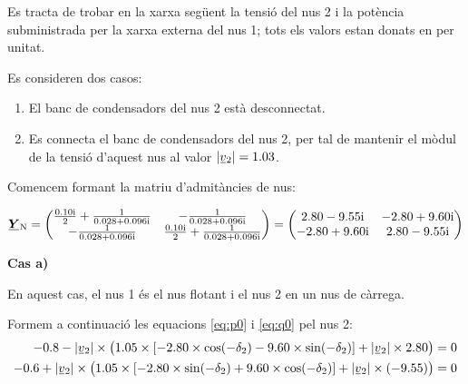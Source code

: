 \break
\begin{exemple}\label{ex:ControlTensCond}
	\addcontentsxms{\ControlTensCond}
    Es tracta de trobar en la xarxa següent la tensió del nus 2 i la
    potència subministrada per la xarxa externa del nus 1; tots els valors
    estan donats en per unitat.

    Es consideren dos casos:
    \begin{enumerate}
       \renewcommand{\labelenumi}{\alph{enumi})}
       \item El banc de condensadors del nus 2 està desconnectat.
       \item Es connecta el banc de condensadors del nus 2, per tal de mantenir el mòdul de
       la tensió d'aquest nus al valor $|\cmplx{v}_2|=\num{1,03}$.
    \end{enumerate}

 	\begin{center}
		
	\end{center}

    Comencem formant la matriu d'admitàncies de nus:

    \[
    \mcmplx{Y}\ped{N} = \begin{pmatrix}
      \frac{\complexnum{j 0,10}}{2} + \frac{1}{\complexnum{0,028+j0,096}} & -\frac{1}{\complexnum{0,028+j0,096}} \\
      -\frac{1}{\complexnum{0,028+j0,096}} & \frac{\complexnum{j 0,10}}{2} + \frac{1}{\complexnum{0,028+j0,096}} \\
    \end{pmatrix} =
    \begin{pmatrix}
      \complexnum{2,80 -j9,55} & \complexnum{-2,80 +j9,60} \\
      \complexnum{-2,80 +j9,60} & \complexnum{2,80 -j9,55} \\
    \end{pmatrix}
    \]

    \textbf{Cas a)}

     En aquest cas, el nus 1 és el nus flotant i el nus 2 en un nus
    de càrrega.

    Formem a continuació les equacions \eqref{eq:p0} i \eqref{eq:q0} pel
    nus 2:
    \begin{align*}
    \num{-0,8} - |\cmplx{v}_2| \times \bigl( \num{1,05}\times [\num{-2,80}\times \cos(-\delta_2) - \num{9,60} \times
    \sin( -\delta_2)]  + |\cmplx{v}_2| \times \num{2,80} \bigr) &= 0 \\
    -\num{0,6} + |\cmplx{v}_2| \times\bigl( \num{1,05} \times[-\num{2,80}\times\sin(-\delta_2) +
    \num{9,60}\times\cos( -\delta_2)]  + |\cmplx{v}_2|\times (-\num{9,55}) \bigr) &= 0
    \end{align*}


\end{exemple}
